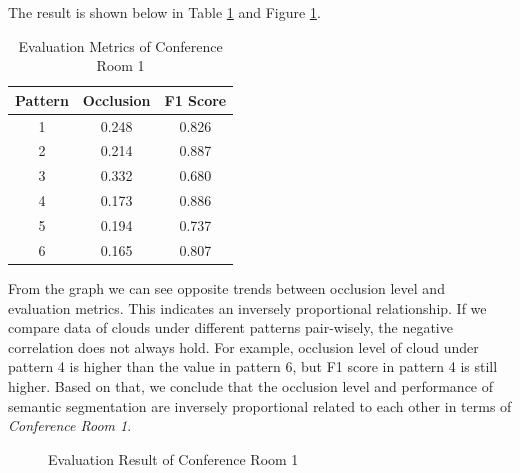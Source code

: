 \documentclass[11pt, a4paper,oneside,chapterprefix=false]{scrbook}
\begin{document}
The result is shown below in Table \ref{tab:evaluation metrics of conference room 1} and Figure \ref{fig:evaluation metrics of conference room 1}.

\begin{table}[H]
    \centering
    \begin{tabular}{|c|c|c|}
        \hline
        Pattern & Occlusion & F1 Score \\
        \hline
        1 & 0.248 & 0.826 \\
        2 & 0.214 & 0.887 \\
        3 & 0.332 & 0.680 \\
        4 & 0.173 & 0.886 \\
        5 & 0.194 & 0.737 \\
        6 & 0.165 & 0.807 \\
        \hline
    \end{tabular}
    \caption{Evaluation Metrics of Conference Room 1}
    \label{tab:evaluation metrics of conference room 1}
\end{table}

From the graph we can see opposite trends between occlusion level and evaluation metrics. This indicates an inversely proportional relationship. If we compare data of clouds under different patterns pair-wisely, the negative correlation does not always hold. For example, occlusion level of cloud under pattern 4 is higher than the value in pattern 6, but F1 score in pattern 4 is still higher. Based on that, we conclude that the occlusion level and performance of semantic segmentation are inversely proportional related to each other in terms of \emph{Conference Room 1}.

\begin{figure}[H]
    \centering
    \caption{Evaluation Result of Conference Room 1}
    \label{fig:evaluation metrics of conference room 1}
\end{figure}
\end{document}
